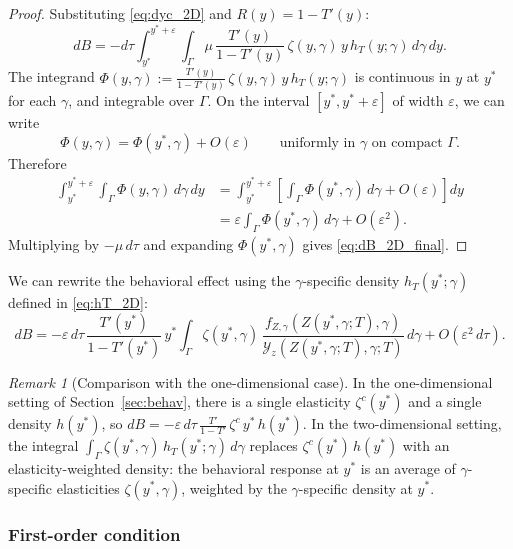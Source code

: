 \documentclass[12pt,a4paper]{article}
\theoremstyle{definition}
\theoremstyle{plain}
\theoremstyle{remark}
\newtheorem{remark}{Remark}[section]
\newcommand{\calY}{\mathcal{Y}}
\begin{document}
\begin{proof}
Substituting \eqref{eq:dyc_2D} and $R(y) = 1 - T'(y)$:
\[
  dB = -d\tau \int_{y^*}^{y^*+\varepsilon}\int_{\Gamma} \mu\,\frac{T'(y)}{1-T'(y)}\,\zeta(y,\gamma)\,y\,h_T(y;\gamma)\,d\gamma\,dy.
\]
The integrand $\Phi(y,\gamma) := \frac{T'(y)}{1-T'(y)}\,\zeta(y,\gamma)\,y\,h_T(y;\gamma)$ is continuous in $y$ at $y^*$ for each $\gamma$, and integrable over $\Gamma$.  On the interval $[y^*,y^*+\varepsilon]$ of width $\varepsilon$, we can write
\[
  \Phi(y,\gamma) = \Phi(y^*,\gamma) + O(\varepsilon) \qquad \text{uniformly in $\gamma$ on compact $\Gamma$}.
\]
Therefore
\begin{align*}
  \int_{y^*}^{y^*+\varepsilon}\int_{\Gamma} \Phi(y,\gamma)\,d\gamma\,dy
  &= \int_{y^*}^{y^*+\varepsilon}\left[\int_{\Gamma}\Phi(y^*,\gamma)\,d\gamma + O(\varepsilon)\right] dy \\
  &= \varepsilon \int_{\Gamma}\Phi(y^*,\gamma)\,d\gamma + O(\varepsilon^2).
\end{align*}
Multiplying by $-\mu\,d\tau$ and expanding $\Phi(y^*,\gamma)$ gives \eqref{eq:dB_2D_final}.
\end{proof}

We can rewrite the behavioral effect using the $\gamma$-specific density $h_T(y^*;\gamma)$ defined in \eqref{eq:hT_2D}:
\begin{equation}
\label{eq:dB_2D_primitive}
  dB = -\varepsilon\,d\tau\,\frac{T'(y^*)}{1-T'(y^*)}\,y^*\int_{\Gamma} \zeta(y^*,\gamma)\,\frac{f_{Z,\gamma}(Z(y^*,\gamma;T),\gamma)}{\calY_z(Z(y^*,\gamma;T),\gamma;T)}\,d\gamma + O(\varepsilon^2\,d\tau).
\end{equation}

\begin{remark}[Comparison with the one-dimensional case]
In the one-dimensional setting of Section~\ref{sec:behav}, there is a single elasticity $\zeta^c(y^*)$ and a single density $h(y^*)$, so $dB = -\varepsilon\,d\tau\,\frac{T'}{1-T'}\,\zeta^c\,y^*\,h(y^*)$.  In the two-dimensional setting, the integral $\int_{\Gamma} \zeta(y^*,\gamma)\,h_T(y^*;\gamma)\,d\gamma$ replaces $\zeta^c(y^*)\,h(y^*)$ with an elasticity-weighted density: the behavioral response at $y^*$ is an average of $\gamma$-specific elasticities $\zeta(y^*,\gamma)$, weighted by the $\gamma$-specific density at $y^*$.
\end{remark}

\subsubsection{First-order condition}
\end{document}
